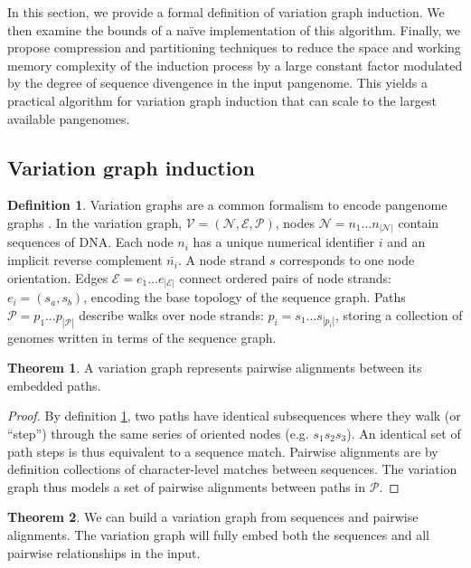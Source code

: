 \documentclass{bioinfo}
\theoremstyle{definition}
\newtheorem{definition}{Definition}[section]
\newtheorem{theorem}{Theorem}[section]
\begin{document}
In this section, we provide a formal definition of variation graph induction.
We then examine the bounds of a na\"{i}ve implementation of this algorithm.
Finally, we propose compression and partitioning techniques to reduce the space and working memory complexity of the induction process by a large constant factor modulated by the degree of sequence divengence in the input pangenome.
This yields a practical algorithm for variation graph induction that can scale to the largest available pangenomes.

\subsection{Variation graph induction}

\begin{definition}
\label{def:vg}
Variation graphs are a common formalism to encode pangenome graphs \citep{Garrison_2019_thesis}.
In the variation graph, $\mathcal{V} = (\mathcal{N}, \mathcal{E}, \mathcal{P})$, nodes $\mathcal{N} = n_1\ldots n_{|\mathcal{N}|}$ contain sequences of DNA.
Each node $n_i$ has a unique numerical identifier $i$ and an implicit reverse complement $\bar{n_i}$.
A node strand $s$ corresponds to one node orientation.
Edges $\mathcal{E} = e_1\ldots e_{|\mathcal{E}|}$ connect ordered pairs of node strands: $e_i = ( s_a, s_b )$, encoding the base topology of the sequence graph.
Paths $\mathcal{P} = p_1\ldots p_{|\mathcal{P}|}$ describe walks over node strands: $p_i = s_1 \ldots s_{|p_i|}$, storing a collection of genomes written in terms of the sequence graph.
\end{definition}

\begin{theorem}
A variation graph represents pairwise alignments between its embedded paths.
\end{theorem}

\begin{proof}
By definition \ref{def:vg}, two paths have identical subsequences where they walk (or ``step'') through the same series of oriented nodes (e.g. $s_1 s_2 s_3$).
An identical set of path steps is thus equivalent to a sequence match.
Pairwise alignments are by definition collections of character-level matches between sequences.
The variation graph thus models a set of pairwise alignments between paths in $\mathcal{P}$.
\end{proof}

\begin{theorem}
\label{thm:seqwish}
We can build a variation graph from sequences and pairwise alignments.
The variation graph will fully embed both the sequences and all pairwise relationships in the input.
\end{theorem}
\end{document}
